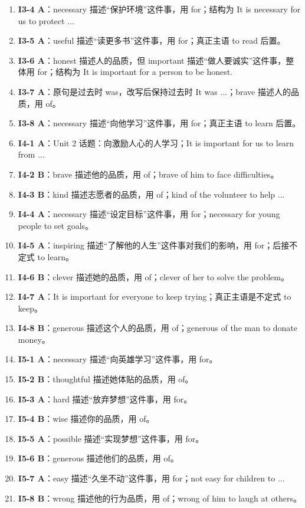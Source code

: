\documentclass[11pt,a4paper]{ctexart}
\begin{document}
\begin{enumerate}[leftmargin=1.6em,itemsep=2pt]
\item \textbf{I3-4 A}：necessary 描述“保护环境”这件事，用 for；结构为 It is necessary for us to protect ...
\item \textbf{I3-5 A}：useful 描述“读更多书”这件事，用 for；真正主语 to read 后置。
\item \textbf{I3-6 A}：honest 描述人的品质，但 important 描述“做人要诚实”这件事，整体用 for；结构为 It is important for a person to be honest.
\item \textbf{I3-7 A}：原句是过去时 was，改写后保持过去时 It was ...；brave 描述人的品质，用 of。
\item \textbf{I3-8 A}：necessary 描述“向他学习”这件事，用 for；真正主语 to learn 后置。
\item \textbf{I4-1 A}：Unit 2 话题：向激励人心的人学习；It is important for us to learn from ...
\item \textbf{I4-2 B}：brave 描述他的品质，用 of；brave of him to face difficulties。
\item \textbf{I4-3 B}：kind 描述志愿者的品质，用 of；kind of the volunteer to help ...
\item \textbf{I4-4 A}：necessary 描述“设定目标”这件事，用 for；necessary for young people to set goals。
\item \textbf{I4-5 A}：inspiring 描述“了解他的人生”这件事对我们的影响，用 for；后接不定式 to learn。
\item \textbf{I4-6 B}：clever 描述她的品质，用 of；clever of her to solve the problem。
\item \textbf{I4-7 A}：It is important for everyone to keep trying；真正主语是不定式 to keep。
\item \textbf{I4-8 B}：generous 描述这个人的品质，用 of；generous of the man to donate money。
\item \textbf{I5-1 A}：necessary 描述“向英雄学习”这件事，用 for。
\item \textbf{I5-2 B}：thoughtful 描述她体贴的品质，用 of。
\item \textbf{I5-3 A}：hard 描述“放弃梦想”这件事，用 for。
\item \textbf{I5-4 B}：wise 描述你的品质，用 of。
\item \textbf{I5-5 A}：possible 描述“实现梦想”这件事，用 for。
\item \textbf{I5-6 B}：generous 描述他们的品质，用 of。
\item \textbf{I5-7 A}：easy 描述“久坐不动”这件事，用 for；not easy for children to ...
\item \textbf{I5-8 B}：wrong 描述他的行为品质，用 of；wrong of him to laugh at others。

\end{enumerate}
\end{document}
